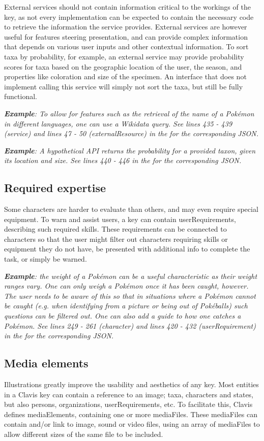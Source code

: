 \documentclass[10pt,letterpaper]{article}
\begin{document}
External services should not contain information critical to the workings of the key, as not every implementation can be expected to contain the necessary code to retrieve the information the service provides. External services are however useful for features steering presentation, and can provide complex information that depends on various user inputs and other contextual information. To sort taxa by probability, for example, an external service may provide probability scores for taxa based on the geographic location of the user, the season, and properties like coloration and size of the specimen. An interface that does not implement calling this service will simply not sort the taxa, but still be fully functional.

\textit{\textbf{Example}: To allow for features such as the retrieval of the name of a Pokémon in different languages, one can use a Wikidata query. See lines 435 - 439 (service) and lines 47 - 50 (externalResource) in the  for the corresponding JSON.}

\textit{\textbf{Example}: A hypothetical API returns the probability for a provided taxon, given its location and size. See lines 440 - 446 in the  for the corresponding JSON.}
\subsection*{
Required expertise
}
Some characters are harder to evaluate than others, and may even require special equipment. To warn and assist users, a key can contain userRequirements, describing such required skills. These requirements can be connected to characters so that the user might filter out characters requiring skills or equipment they do not have, be presented with additional info to complete the task, or simply be warned.

\textit{\textbf{Example}: the weight of a Pokémon can be a useful characteristic as their weight ranges vary. One can only weigh a Pokémon once it has been caught, however. The user needs to be aware of this so that in situations where a Pokémon cannot be caught (e.g. when identifying from a picture or being out of Pokéballs) such questions can be filtered out. One can also add a guide to how one catches a Pokémon. See lines 249 - 261 (character) and lines 420 - 432 (userRequirement) in the  for the corresponding JSON.}

\subsection*{
Media elements
}
Illustrations greatly improve the usability and aesthetics of any key. Most entities in a Clavis key can contain a reference to an image; taxa, characters and states, but also persons, organizations, userRequirements, etc. To facilitate this, Clavis defines mediaElements, containing one or more mediaFiles. These mediaFiles can contain and/or link to image, sound or video files, using an array of mediaFiles to allow different sizes of the same file to be included.
\end{document}
